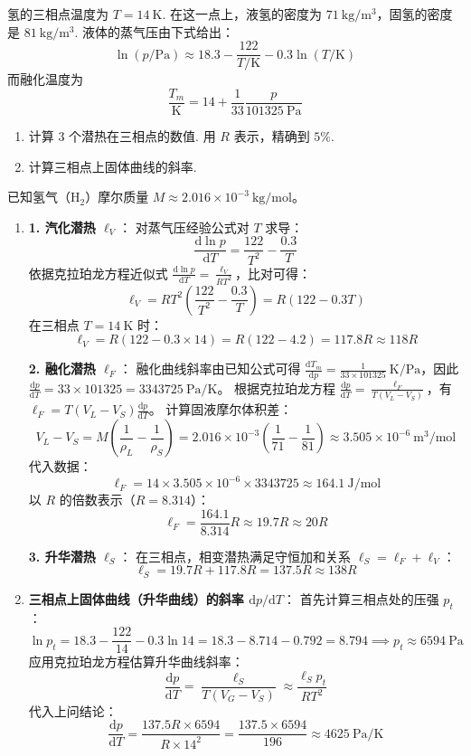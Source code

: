 \begin{exercise}\label{ex:14.8}
氢的三相点温度为 $T = 14 \ \mathrm{K}$. 在这一点上，液氢的密度为 $71 \ \mathrm{kg/m^3}$，固氢的密度是 $81 \ \mathrm{kg/m^3}$. 液体的蒸气压由下式给出：
$$ \ln(p/\mathrm{Pa}) \approx 18.3 - \frac{122}{T/\mathrm{K}} - 0.3 \ln(T/\mathrm{K}) $$
而融化温度为
$$ \frac{T_m}{\mathrm{K}} = 14 + \frac{1}{33} \frac{p}{101325 \ \mathrm{Pa}} $$
\begin{enumerate}
  \item[(a)] 计算 3 个潜热在三相点的数值. 用 $R$ 表示，精确到 $5\%$.
  \item[(b)] 计算三相点上固体曲线的斜率.
\end{enumerate}
\end{exercise}
\begin{solution}
已知氢气（$\mathrm{H_2}$）摩尔质量 $M \approx 2.016 \times 10^{-3} \ \mathrm{kg/mol}$。
\begin{enumerate}
    \item[(a)] \textbf{1. 汽化潜热 $\ell_V$}：
    对蒸气压经验公式对 $T$ 求导：
    $$ \frac{\mathrm{d}\ln p}{\mathrm{d}T} = \frac{122}{T^2} - \frac{0.3}{T} $$
    依据克拉珀龙方程近似式 $\frac{\mathrm{d}\ln p}{\mathrm{d}T} = \frac{\ell_V}{RT^2}$，比对可得：
    $$ \ell_V = RT^2 \left( \frac{122}{T^2} - \frac{0.3}{T} \right) = R(122 - 0.3T) $$
    在三相点 $T = 14 \ \mathrm{K}$ 时：
    $$ \ell_V = R(122 - 0.3 \times 14) = R(122 - 4.2) = 117.8R \approx 118R $$
    
    \textbf{2. 融化潜热 $\ell_F$}：
    融化曲线斜率由已知公式可得 $\frac{\mathrm{d}T_m}{\mathrm{d}p} = \frac{1}{33 \times 101325} \ \mathrm{K/Pa}$，因此 $\frac{\mathrm{d}p}{\mathrm{d}T} = 33 \times 101325 = 3343725 \ \mathrm{Pa/K}$。
    根据克拉珀龙方程 $\frac{\mathrm{d}p}{\mathrm{d}T} = \frac{\ell_F}{T(V_L - V_S)}$，有 $\ell_F = T(V_L - V_S) \frac{\mathrm{d}p}{\mathrm{d}T}$。
    计算固液摩尔体积差：
    $$ V_L - V_S = M \left( \frac{1}{\rho_L} - \frac{1}{\rho_S} \right) = 2.016 \times 10^{-3} \left( \frac{1}{71} - \frac{1}{81} \right) \approx 3.505 \times 10^{-6} \ \mathrm{m^3/mol} $$
    代入数据：
    $$ \ell_F = 14 \times 3.505 \times 10^{-6} \times 3343725 \approx 164.1 \ \mathrm{J/mol} $$
    以 $R$ 的倍数表示（$R = 8.314$）：
    $$ \ell_F = \frac{164.1}{8.314} R \approx 19.7R \approx 20R $$
    
    \textbf{3. 升华潜热 $\ell_S$}：
    在三相点，相变潜热满足守恒加和关系 $\ell_S = \ell_F + \ell_V$：
    $$ \ell_S = 19.7R + 117.8R = 137.5R \approx 138R $$

    \item[(b)] \textbf{三相点上固体曲线（升华曲线）的斜率 $\mathrm{d}p/\mathrm{d}T$}：
    首先计算三相点处的压强 $p_t$：
    $$ \ln p_t = 18.3 - \frac{122}{14} - 0.3 \ln 14 = 18.3 - 8.714 - 0.792 = 8.794 \implies p_t \approx 6594 \ \mathrm{Pa} $$
    应用克拉珀龙方程估算升华曲线斜率：
    $$ \frac{\mathrm{d}p}{\mathrm{d}T} = \frac{\ell_S}{T(V_G - V_S)} \approx \frac{\ell_S p_t}{RT^2} $$
    代入上问结论：
    $$ \frac{\mathrm{d}p}{\mathrm{d}T} = \frac{137.5 R \times 6594}{R \times 14^2} = \frac{137.5 \times 6594}{196} \approx 4625 \ \mathrm{Pa/K} $$
\end{enumerate}
\end{solution}

